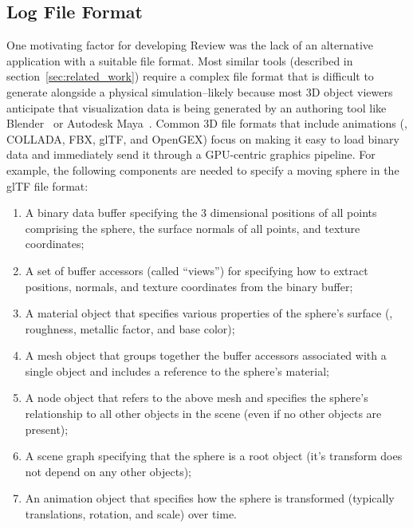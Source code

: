 \subsection{Log File Format}

One motivating factor for developing Review was the lack of an alternative application with a suitable file format.
%
Most similar tools (described in section~\ref{sec:related_work}) require a complex file format that is difficult to generate alongside a physical simulation--likely because most 3D object viewers anticipate that visualization data is being generated by an authoring tool like Blender~\autocite{Blain.2012.Book.Blender} or Autodesk Maya~\autocite{Palamar.2015.Book.Maya}.
%
Common 3D file formats that include animations (\eg{}, COLLADA, FBX, glTF, and OpenGEX) focus on making it easy to load binary data and immediately send it through a GPU-centric graphics pipeline.
%
For example, the following components are needed to specify a moving sphere in the glTF file format:


\begin{enumerate}

  \item A binary data buffer specifying the 3 dimensional positions of all points comprising the sphere, the surface normals of all points, and texture coordinates;

  \item A set of buffer accessors (called ``views'') for specifying how to extract positions, normals, and texture coordinates from the binary buffer;

  \item A material object that specifies various properties of the sphere's surface (\ie{}, roughness, metallic factor, and base color);

  \item A mesh object that groups together the buffer accessors associated with a single object and includes a reference to the sphere's material;

  \item A node object that refers to the above mesh and specifies the sphere's relationship to all other objects in the scene (even if no other objects are present);

  \item A scene graph specifying that the sphere is a root object (it's transform does not depend on any other objects);

  \item An animation object that specifies how the sphere is transformed (typically translations, rotation, and scale) over time.

\end{enumerate}


